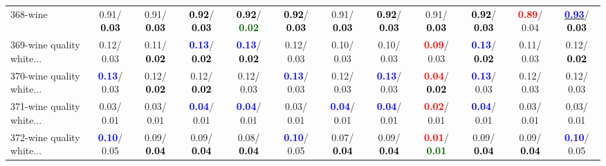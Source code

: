 \begin{table}[h]
\begin{center}
{\begin{tabular}{lc|c|c|c|c|c|c|c|c|c|c}
368-wine &   0.91/\textcolor{black}{\textbf{  0.03}} &   0.91/\textcolor{black}{\textbf{  0.03}} & \textcolor{black}{\textbf{  0.92}}/\textcolor{black}{\textbf{  0.03}} & \textcolor{black}{\textbf{  0.92}}/\textcolor{darkgreen}{\textbf{  0.02}} & \textcolor{black}{\textbf{  0.92}}/\textcolor{black}{\textbf{  0.03}} &   0.91/\textcolor{black}{\textbf{  0.03}} & \textcolor{black}{\textbf{  0.92}}/\textcolor{black}{\textbf{  0.03}} &   0.91/\textcolor{black}{\textbf{  0.03}} & \textcolor{black}{\textbf{  0.92}}/\textcolor{black}{\textbf{  0.03}} & \textcolor{red}{\textbf{  0.89}}/  0.04 & \underline{\textcolor{blue}{\textbf{  0.93}}}/\textcolor{black}{\textbf{  0.03}} \\
369-wine quality white... &   0.12/  0.03 &   0.11/\textcolor{black}{\textbf{  0.02}} & \textcolor{blue}{\textbf{  0.13}}/\textcolor{black}{\textbf{  0.02}} & \textcolor{blue}{\textbf{  0.13}}/\textcolor{black}{\textbf{  0.02}} &   0.12/  0.03 &   0.10/  0.03 &   0.10/  0.03 & \textcolor{red}{\textbf{  0.09}}/  0.03 & \textcolor{blue}{\textbf{  0.13}}/\textcolor{black}{\textbf{  0.02}} &   0.11/  0.03 &   0.12/\textcolor{black}{\textbf{  0.02}} \\
370-wine quality white... & \textcolor{blue}{\textbf{  0.13}}/  0.03 &   0.12/\textcolor{black}{\textbf{  0.02}} &   0.12/\textcolor{black}{\textbf{  0.02}} &   0.12/  0.03 & \textcolor{blue}{\textbf{  0.13}}/  0.03 &   0.12/  0.03 & \textcolor{blue}{\textbf{  0.13}}/  0.03 & \textcolor{red}{\textbf{  0.04}}/\textcolor{black}{\textbf{  0.02}} & \textcolor{blue}{\textbf{  0.13}}/  0.03 &   0.12/  0.03 &   0.12/  0.03 \\
371-wine quality white... &   0.03/  0.01 &   0.03/  0.01 & \textcolor{blue}{\textbf{  0.04}}/  0.01 & \textcolor{blue}{\textbf{  0.04}}/  0.01 &   0.03/  0.01 & \textcolor{blue}{\textbf{  0.04}}/  0.01 & \textcolor{blue}{\textbf{  0.04}}/  0.01 & \textcolor{red}{\textbf{  0.02}}/  0.01 & \textcolor{blue}{\textbf{  0.04}}/  0.01 &   0.03/  0.01 &   0.03/  0.01 \\
372-wine quality white... & \textcolor{blue}{\textbf{  0.10}}/  0.05 &   0.09/\textcolor{black}{\textbf{  0.04}} &   0.09/\textcolor{black}{\textbf{  0.04}} &   0.08/\textcolor{black}{\textbf{  0.04}} & \textcolor{blue}{\textbf{  0.10}}/  0.05 &   0.07/\textcolor{black}{\textbf{  0.04}} &   0.09/\textcolor{black}{\textbf{  0.04}} & \textcolor{red}{\textbf{  0.01}}/\textcolor{darkgreen}{\textbf{  0.01}} &   0.09/\textcolor{black}{\textbf{  0.04}} &   0.09/\textcolor{black}{\textbf{  0.04}} & \textcolor{blue}{\textbf{  0.10}}/  0.05 \\

\end{tabular}}
\end{center}
\end{table}
